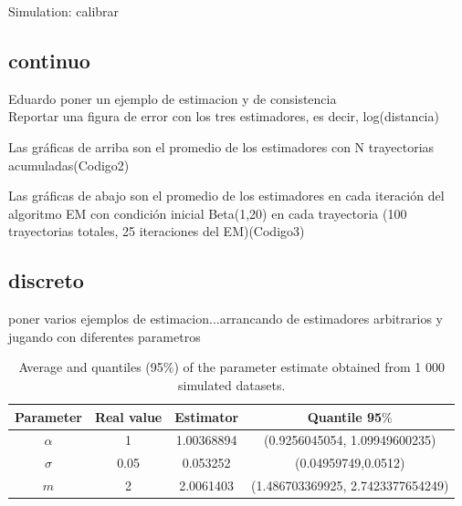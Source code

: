 \documentclass[12pt, reqno]{amsart}
\makeatletter
\def\section{\@startsection{section}{1}%
     \z@{.7\linespacing\@plus\linespacing}{.5\linespacing}%
     {\bfseries
     \centering
     }}
\newcommand{\1}{{\bf 1}}
\newcommand{\2}{{\bf 2}}
\theoremstyle{definition}
\theoremstyle{remark}
\numberwithin{equation}{section}
\makeatother
\begin{document}

\section{Simulation: calibrar}
\subsection{continuo}
{\color{red}  Eduardo poner un ejemplo de estimacion y de consistencia}\\
\singlespace
{\color{red} Reportar una figura de error con los tres estimadores, es decir, log(distancia)}

{\color{red} Las gráficas de arriba son el promedio de los estimadores con N trayectorias acumuladas(Codigo2)}

{\color{red} Las gráficas de abajo son el promedio de los estimadores en cada iteración del algoritmo EM con condición inicial Beta(1,20) en cada trayectoria (100 trayectorias totales, 25 iteraciones del EM)(Codigo3)}

\subsection{discreto}
{\color{red} poner varios ejemplos de estimacion...arrancando de estimadores arbitrarios y jugando con diferentes parametros}


\begin{table}[]
\begin{tabular}{cccc}
\hline
Parameter & Real value   & Estimator    & Quantile 95$\%$ \\ \hline
$\alpha$ & 1  & 1.00368894 & (0.9256045054, 1.09949600235) \\ \hline
$\sigma$ & 0.05  & 0.053252 & (0.04959749,0.0512) \\ \hline
$m$ & 2  & 2.0061403 & (1.486703369925, 2.7423377654249)\\ \hline
\end{tabular}
\caption{ Average and quantiles (95$\%$) of the parameter estimate obtained from 1
000 simulated datasets. }
\end{table}
\end{document}
